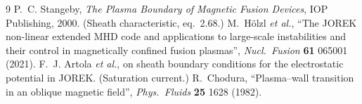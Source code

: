 \documentclass[11pt,a4paper]{article}
\begin{document}
\begin{thebibliography}{9}
 P.~C. Stangeby, \emph{The Plasma Boundary of Magnetic Fusion Devices},
  IOP Publishing, 2000. (Sheath characteristic, eq.~2.68.)
 M.~H\"olzl \emph{et al.}, ``The JOREK non-linear extended MHD code and
  applications to large-scale instabilities and their control in magnetically confined fusion
  plasmas'', \emph{Nucl.\ Fusion} \textbf{61} 065001 (2021).
 F.~J. Artola \emph{et al.}, on sheath boundary conditions for the electrostatic
  potential in JOREK. (Saturation current.)
 R.~Chodura, ``Plasma--wall transition in an oblique magnetic field'',
  \emph{Phys.\ Fluids} \textbf{25} 1628 (1982).
\end{thebibliography}
\end{document}
